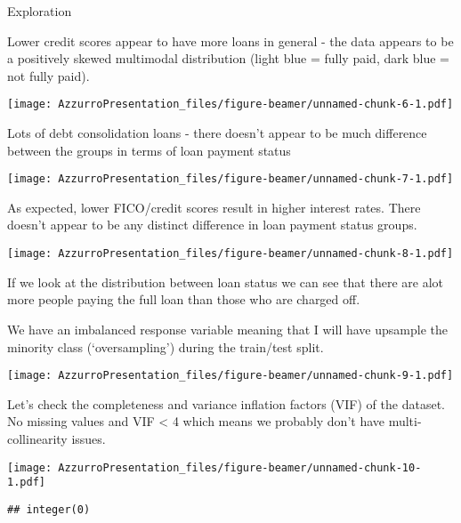 \documentclass[ignorenonframetext,]{beamer}
\newenvironment{Shaded}{\begin{snugshade}}{\end{snugshade}}
\newcommand{\KeywordTok}[1]{\textcolor[rgb]{0.13,0.29,0.53}{\textbf{{#1}}}}
\newcommand{\DecValTok}[1]{\textcolor[rgb]{0.00,0.00,0.81}{{#1}}}
\newcommand{\NormalTok}[1]{{#1}}
\begin{document}
\begin{frame}{Exploration}

Lower credit scores appear to have more loans in general - the data
appears to be a positively skewed multimodal distribution (light blue =
fully paid, dark blue = not fully paid).

\texttt{[image: AzzurroPresentation\_files/figure-beamer/unnamed-chunk-6-1.pdf]}

\end{frame}

\begin{frame}

Lots of debt consolidation loans - there doesn't appear to be much
difference between the groups in terms of loan payment status

\texttt{[image: AzzurroPresentation\_files/figure-beamer/unnamed-chunk-7-1.pdf]}

\end{frame}

\begin{frame}

As expected, lower FICO/credit scores result in higher interest rates.
There doesn't appear to be any distinct difference in loan payment
status groups.

\texttt{[image: AzzurroPresentation\_files/figure-beamer/unnamed-chunk-8-1.pdf]}

\end{frame}

\begin{frame}

If we look at the distribution between loan status we can see that there
are alot more people paying the full loan than those who are charged
off.

We have an imbalanced response variable meaning that I will have
upsample the minority class (`oversampling') during the train/test
split.

\texttt{[image: AzzurroPresentation\_files/figure-beamer/unnamed-chunk-9-1.pdf]}

\end{frame}

\begin{frame}[fragile]

Let's check the completeness and variance inflation factors (VIF) of the
dataset. No missing values and VIF \textless{} 4 which means we probably
don't have multi-collinearity issues.

\texttt{[image: AzzurroPresentation\_files/figure-beamer/unnamed-chunk-10-1.pdf]}

\begin{Shaded}
\end{Shaded}

\begin{verbatim}
## integer(0)
\end{verbatim}

\end{frame}
\end{document}
